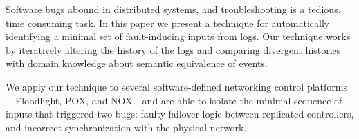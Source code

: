 Software bugs abound in distributed systems, and troubleshooting
is a tedious, time consuming task.
In this paper we present a technique for automatically identifying
a minimal set of fault-inducing inputs from logs. Our technique works by
iteratively altering the history of the logs and comparing divergent histories
with domain knowledge about semantic equivalence of events.

We apply our technique to several software-defined networking control
platforms---Floodlight, POX, and NOX---and
are able to isolate the minimal sequence of inputs that triggered
two bugs: faulty failover logic between replicated controllers, and incorrect
synchronization with the physical network.
